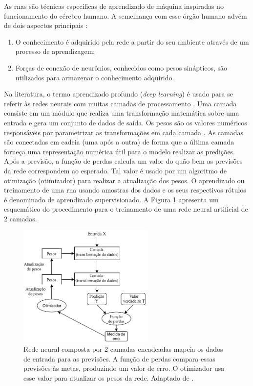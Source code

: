 As \acrshort{rna}s são técnicas específicas de aprendizado de máquina inspiradas no funcionamento do cérebro humano. A semelhança com esse órgão humano advém de dois aspectos principais \cite{Haykin}:
\begin{enumerate}
	\item O conhecimento é adquirido pela rede a partir do seu ambiente através de um processo de aprendizagem;
	\item Forças de conexão de neurônios, conhecidos como pesos sinápticos, são utilizados para armazenar o conhecimento adquirido.
\end{enumerate}

Na literatura, o termo aprendizado profundo (\textit{deep learning}) é usado para se referir às redes neurais com muitas camadas de processamento \cite{lecun2015deep,bengio2009learning}. Uma camada consiste em um módulo que realiza uma transformação matemática sobre uma entrada e gera um conjunto de dados de saída. Os pesos são os valores numéricos responsáveis por parametrizar as transformações em cada camada \cite{FrancoisDeepLearning}. 
As camadas são conectadas em cadeia (uma após a outra) de forma que a última camada forneça uma representação numérica útil para o modelo realizar as predições. Após a previsão, a função de perdas calcula  um valor do quão bem as previsões da rede correspondem ao esperado. Tal valor é usado por um algoritmo de otimização (otimizador) para realizar a atualização dos pesos. 
O aprendizado ou treinamento de uma \acrshort{rna} usando amostras dos dados e os seus respectivos rótulos é denominado de aprendizado supervisionado. A  Figura \ref{fig:modeloRNA} apresenta um esquemático do procedimento para o treinamento de uma rede neural artificial de 2 camadas.

\begin{figure}[h]
	\centering
	\includegraphics[width=0.6\textwidth]{figuras/modeloRNA.pdf}
	\caption[Principais componentes em uma \acrshort{rna}]{Rede neural composta por 2 camadas encadeadas mapeia os dados de entrada para as previsões. A função de perdas compara essas previsões às metas, produzindo um valor de erro. O otimizador usa esse valor para atualizar os pesos da rede. Adaptado de \cite{FrancoisDeepLearning}.}
	\label{fig:modeloRNA}
\end{figure}


